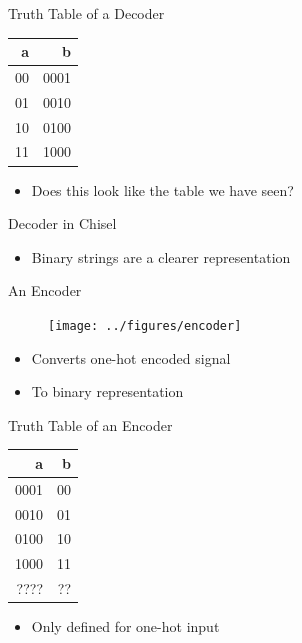 \begin{frame}[fragile]{Truth Table of a Decoder}
\begin{table}
  \begin{tabular}{rr}
    \toprule
    a & b \\
    \midrule
    00 & 0001 \\
    01 & 0010 \\
    10 & 0100 \\
    11 & 1000 \\
    \bottomrule 
  \end{tabular} 
\end{table}
\begin{itemize}
\item Does this look like the table we have seen?
\end{itemize}
\end{frame}

\begin{frame}[fragile]{Decoder in Chisel}
\begin{itemize}
\item Binary strings are a clearer representation
\end{itemize}
\end{frame}

\begin{frame}[fragile]{An Encoder}
\begin{figure}
  \texttt{[image: ../figures/encoder]}
\end{figure}
\begin{itemize}
\item Converts one-hot encoded signal
\item To binary representation
\end{itemize}
\end{frame}

\begin{frame}[fragile]{Truth Table of an Encoder}
\begin{table}
  \begin{tabular}{rr}
    \toprule
    a & b \\
    \midrule
    0001 & 00 \\
    0010 & 01 \\
    0100 & 10 \\
    1000 & 11 \\
    ???? & ?? \\
    \bottomrule 
  \end{tabular} 
\end{table}
\begin{itemize}
\item Only defined for one-hot input
\end{itemize}
\end{frame}

